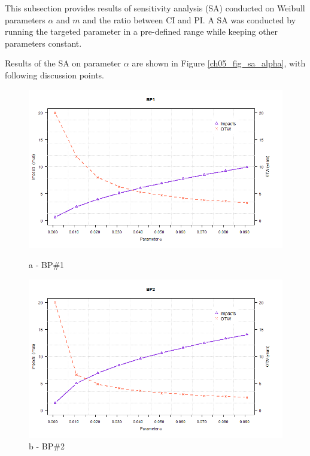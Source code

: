 This subsection provides results of sensitivity analysis (SA) conducted on Weibull parameters $\alpha$ and $m$ and the ratio between CI and PI. A SA was conducted by running the targeted parameter in a pre-defined range while keeping other parameters constant.

Results of the SA on parameter $\alpha$ are shown in Figure \ref{ch05_fig_sa_alpha}, with following discussion points.

\begin{figure}[!htb]
	\begin{minipage}[b]{0.5\linewidth}
		\centering
		\includegraphics[width=\textwidth]{figures/ch05_fig_saalpha_pump1}
		\caption*{a - BP\#1}
	\end{minipage}
	\hspace{0.05cm}
	\begin{minipage}[b]{0.5\linewidth}
		\centering
		\includegraphics[width=\textwidth]{figures/ch05_fig_saalpha_pump2}
		\caption*{b - BP\#2}
	\end{minipage}

\end{figure}
